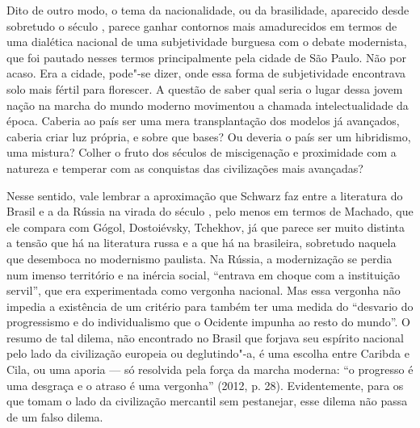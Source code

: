 Dito de outro modo, o tema da nacionalidade, ou da brasilidade,
aparecido desde sobretudo o século , parece ganhar contornos mais
amadurecidos em termos de uma dialética nacional de uma subjetividade
burguesa com o debate modernista, que foi pautado nesses termos
principalmente pela cidade de São Paulo. Não por acaso. Era a cidade,
pode"-se dizer, onde essa forma de subjetividade encontrava solo mais
fértil para florescer. A questão de saber qual seria o lugar dessa jovem
nação na marcha do mundo moderno movimentou a chamada intelectualidade
da época. Caberia ao país ser uma mera transplantação dos modelos já
avançados, caberia criar luz própria, e sobre que bases? Ou deveria o
país ser um hibridismo, uma mistura? Colher o fruto dos séculos de
miscigenação e proximidade com a natureza e temperar com as conquistas
das civilizações mais avançadas?

Nesse sentido, vale lembrar a aproximação que Schwarz faz entre a
literatura do Brasil e a da Rússia na virada do século , pelo menos em
termos de Machado, que ele compara com Gógol, Dostoiévsky, Tchekhov, já
que parece ser muito distinta a tensão que há na literatura russa e a
que há na brasileira, sobretudo naquela que desemboca no modernismo
paulista. Na Rússia, a modernização se perdia num imenso território e na
inércia social, ``entrava em choque com a instituição servil'', que era
experimentada como vergonha nacional. Mas essa vergonha não impedia a
existência de um critério para também ter uma medida do ``desvario do
progressismo e do individualismo que o Ocidente impunha ao resto do
mundo''. O resumo de tal dilema, não encontrado no Brasil que forjava
seu espírito nacional pelo lado da civilização europeia ou deglutindo"-a,
é uma escolha entre Caribda e Cila, ou uma aporia --- só resolvida pela
força da marcha moderna: ``o progresso é uma desgraça e o atraso é uma
vergonha'' (2012, p. 28). Evidentemente, para os que tomam o lado da
civilização mercantil sem pestanejar, esse dilema não passa de um falso
dilema.

